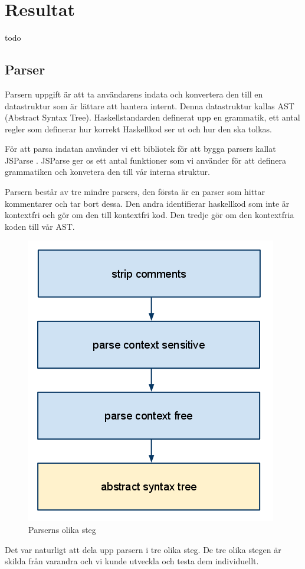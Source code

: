 \section{Resultat}
todo

\subsection{Parser} 
Parsern uppgift är att ta användarens indata och konvertera den till en datastruktur 
som är lättare att hantera internt. Denna datastruktur kallas AST (Abstract Syntax Tree). 
Haskellstandarden definerat upp en grammatik, ett antal regler som definerar hur korrekt Haskellkod ser ut och hur den ska tolkas.

För att parsa indatan använder vi ett bibliotek för att bygga parsers kallat JSParse \citep{jsparse}.
JSParse ger os ett antal funktioner som vi använder för att definera grammatiken och konvetera den till vår interna struktur.

Parsern består av tre mindre parsers, den första är en parser som hittar kommentarer och tar bort dessa. 
Den andra identifierar haskellkod som inte är kontextfri och gör om den till kontextfri kod. Den tredje gör om den kontextfria koden till vår AST.

\begin{figure}[H]
    \begin{center}
        \includegraphics[width=.5\textwidth]{parser_1.png}
        \caption{Parserns olika steg}
    \end{center}
\end{figure}

Det var naturligt att dela upp parsern i tre olika steg. De tre olika stegen är skilda från varandra och vi kunde utveckla och testa dem individuellt.

